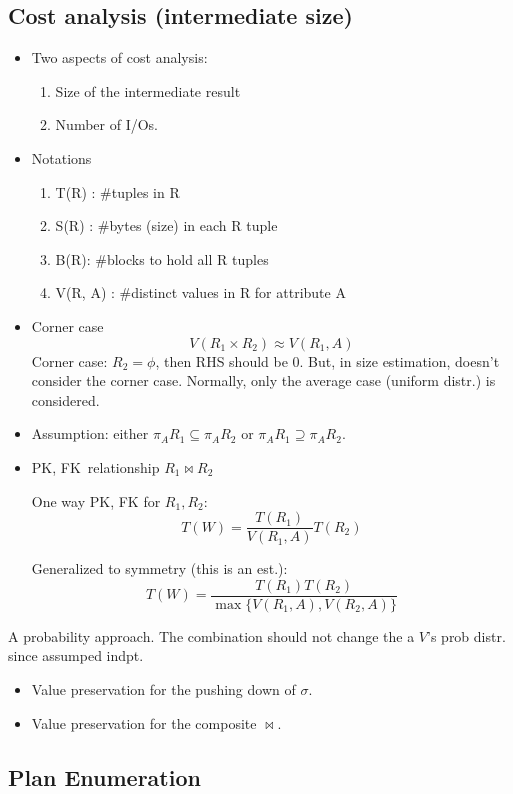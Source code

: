 \documentclass[a4paper]{report}
\begin{document}
\subsection{Cost analysis (intermediate size)}
\begin{itemize}
\item Two aspects of cost analysis:
\begin{enumerate}
\item Size of the intermediate result 
\item Number of I/Os.
\end{enumerate}
\item Notations
\begin{enumerate}
\item T(R) : #tuples in R
\item S(R) : #bytes (size) in each R tuple
\item B(R): #blocks to hold all R tuples 
\item V(R, A) : #distinct values in R for attribute A
\end{enumerate}
\item Corner case 
$$
V(R_1\times R_2) \approx V(R_1, A)
$$
Corner case: $R_2=\phi$, then RHS should be 0. But, in size estimation, doesn't consider the corner case. Normally, only the average case (uniform distr.) is considered. 
\end{itemize}
\begin{itemize}
\item Assumption: either $\pi_{A}R_1 \subseteq \pi_{A}R_2$ or $\pi_{A}R_1 \supseteq \pi_{A}R_2$.
\item \textbraceleft PK, FK\textbraceright\ relationship $R_1\bowtie R_2$

One way PK, FK for $R_1, R_2$: 
$$
T(W) = \frac{T(R_1)}{V(R_1, A)} T(R_2)
$$

Generalized to symmetry (this is an est.): 
$$
T(W) = \frac{T(R_1)T(R_2)}{\max\{V(R_1, A), V(R_2, A)\}}
$$
\end{itemize}

A probability approach. The combination should not change the a $V$'s prob distr. since assumped indpt.
\begin{itemize}
\item Value preservation for the pushing down of $\sigma$. 
\item Value preservation for the composite $\bowtie$. 
\end{itemize}
\subsection{Plan Enumeration}
\end{document}
